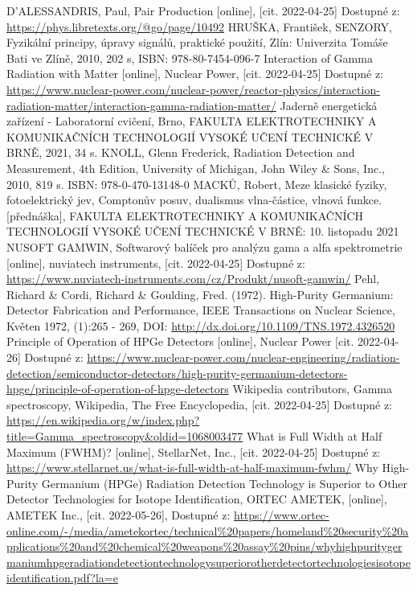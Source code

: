\documentclass[12pt,a4paper]{article}
\newcommand{\citovano}{[cit. 2022-04-25] }
\begin{document}
\begin{spacing}{1.5}
\begin{thebibliography}{}
	 D'ALESSANDRIS, Paul, Pair Production [online], \citovano Dostupné z: \url{ https://phys.libretexts.org/@go/page/10492}
	 HRUŠKA, František, SENZORY, Fyzikální principy, úpravy signálů, praktické použití, Zlín: Univerzita Tomáše Bati ve Zlíně, 2010, 202 s, ISBN: 978-80-7454-096-7
	 Interaction of Gamma Radiation with Matter [online], Nuclear Power, \citovano Dostupné z: \url{https://www.nuclear-power.com/nuclear-power/reactor-physics/interaction-radiation-matter/interaction-gamma-radiation-matter/}
	 Jaderně energetická zařízení - Laboratorní cvičení, Brno, FAKULTA ELEKTROTECHNIKY A KOMUNIKAČNÍCH TECHNOLOGIÍ	VYSOKÉ UČENÍ TECHNICKÉ V BRNĚ, 2021, 34 s.
	  KNOLL, Glenn Frederick, Radiation Detection and Measurement, 4th Edition, University of Michigan, John Wiley \& Sons, Inc., 2010, 819 s. ISBN: 978-0-470-13148-0
	 MACKŮ, Robert, Meze klasické fyziky, fotoelektrický jev, Comptonův posuv, dualismus vlna-částice, vlnová funkce. [přednáška], FAKULTA ELEKTROTECHNIKY A KOMUNIKAČNÍCH TECHNOLOGIÍ VYSOKÉ UČENÍ TECHNICKÉ V BRNĚ: 10. listopadu 2021
	 NUSOFT GAMWIN, Softwarový balíček pro analýzu gama a alfa spektrometrie [online], nuviatech instruments, \citovano Dostupné z: \url{https://www.nuviatech-instruments.com/cz/Produkt/nusoft-gamwin/}
	 Pehl, Richard \& Cordi, Richard \& Goulding, Fred. (1972). High-Purity Germanium: Detector Fabrication and Performance, IEEE Transactions on Nuclear Science, Květen 1972, (1):265 - 269, DOI: \url{http://dx.doi.org/10.1109/TNS.1972.4326520}
	 Principle of Operation of HPGe Detectors [online], Nuclear Power [cit. 2022-04-26] Dostupné z: \url{https://www.nuclear-power.com/nuclear-engineering/radiation-detection/semiconductor-detectors/high-purity-germanium-detectors-hpge/principle-of-operation-of-hpge-detectors}%
	 Wikipedia contributors, Gamma spectroscopy, Wikipedia, The Free Encyclopedia, \citovano  Dostupné z: \url{ https://en.wikipedia.org/w/index.php?title=Gamma_spectroscopy&oldid=1068003477}
	  What is Full Width at Half Maximum (FWHM)? [online], StellarNet, Inc., \citovano  Dostupné z: \url{https://www.stellarnet.us/what-is-full-width-at-half-maximum-fwhm/}
	 Why High-Purity Germanium (HPGe) Radiation Detection Technology is Superior to Other Detector Technologies for Isotope Identification, ORTEC AMETEK, [online], AMETEK Inc., [cit. 2022-05-26], Dostupné z: \url{https://www.ortec-online.com/-/media/ametekortec/technical%20papers/homeland%20security%20applications%20and%20chemical%20weapons%20assay%20pins/whyhighpuritygermaniumhpgeradiationdetectiontechnologysuperiorotherdetectortechnologiesisotopeidentification.pdf?la=e}
\end{thebibliography}
\newpage

\end{spacing}
\end{document}
